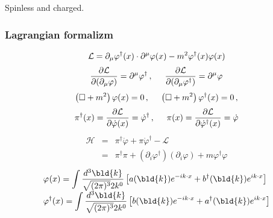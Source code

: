 Spinless and charged.
\subsubsection{Lagrangian formalizm}
\begin{equation}
{\cal L} = \partial_\mu \varphi^\dagger(x)\cdot \partial^\mu \varphi(x)
- m^2 \varphi^\dagger(x)\varphi(x)
\label{eqn:cmplscLagdens}
\end{equation}
\begin{equation}
\frac{\partial {\cal L}}{\partial(\partial_\mu \varphi)} = \partial^\mu \varphi^\dagger
\,,
\hspace{5mm}
\frac{\partial {\cal L}}{\partial(\partial_\mu \varphi^\dagger)} = \partial^\mu \varphi
\end{equation}
\begin{equation}
\left( \Box + m^2 \right) \varphi(x) = 0\,,
\hspace{5mm}
\left( \Box + m^2 \right) \varphi^\dagger(x) = 0\,,
\end{equation}
\begin{equation}
\pi^\dagger(x) = \frac{ \partial {\cal L}}{ \partial \dot{\varphi}(x) } = \dot{\varphi}^\dagger
\,,
\hspace{5mm}
\pi(x) = \frac{ \partial {\cal L}}{ \partial \dot{\varphi}^\dagger(x) } = \dot{\varphi}
\end{equation}
\begin{eqnarray}
\mathcal{H} 
&=&
\pi^\dagger \dot{\varphi} + \pi \dot{\varphi}^\dagger - \mathcal{L}
\nonumber\\
&=&
\pi^\dagger \pi + (\partial_i \varphi^\dagger) (\partial_i \varphi) + m \varphi^\dagger \varphi
\end{eqnarray}
\begin{equation}
\begin{array}{l}
\displaystyle
\varphi_{}(x) = \int \frac{d^3 \bld{k}}{\sqrt{(2\pi)^3}2k^0} \left[
a(\bld{k}) e^{-i k \cdot x} + b^\dagger(\bld{k})e^{i k \cdot x} \right]
\\
\displaystyle
\varphi^\dagger_{}(x) = \int \frac{d^3 \bld{k}}{\sqrt{(2\pi)^3}2k^0} \left[
b(\bld{k})e^{- i k \cdot x}  + a^\dagger (\bld{k}) e^{i k \cdot x} \right]
\end{array}
\label{eqn:CompScFourier}
\end{equation}
